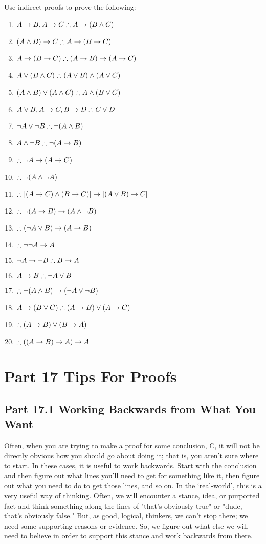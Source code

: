 \problempart
Use indirect proofs to prove the following:
\begin{enumerate}
\item $A \eif B, A \eif C \therefore A \eif (B \eand C)$
\item $(A \eand B) \eif C \therefore A \eif (B \eif C)$
\item $A \eif (B \eif C) \therefore (A \eif B) \eif (A \eif C)$
\item $A \eor (B \eand C) \therefore (A \eor B) \eand (A \eor C)$
\item $(A \eand B) \eor (A \eand C) \therefore A \eand (B \eor C)$
\item $A \eor B, A \eif C, B \eif D \therefore C \eor D$
\item $\enot A \lor \enot B \therefore \enot(A \eand B)$
\item $A \eand \enot B \therefore \enot(A \eif B)$
\item $\therefore \enot A \eif (A \eif C)$
\item $\therefore \enot(A \eand \enot A)$
\item $\therefore [(A \eif C) \eand (B \eif C)] \eif [(A \lor B) \eif C]$
\item $\therefore \enot(A \eif B) \eif (A \eand \enot B)$
\item $\therefore (\enot A \eor B) \eif (A \eif B)$
\item $\therefore \enot\enot A \eif A$
\item $\enot A \eif \enot B \therefore B \eif A$
\item $A \eif B \therefore \enot A \eor B$
\item $\therefore \enot(A \eand B) \eif (\enot A \eor \enot B)$
\item $A \eif (B \eor C) \therefore (A \eif B) \eor (A \eif C)$
\item $\therefore (A \eif B) \lor (B \eif A)$
\item $\therefore ((A \eif B) \eif A) \eif A$
\end{enumerate}

\chapter{Part 17 Tips For Proofs}
\section{Part 17.1 Working Backwards from What You Want}
Often, when you are trying to make a proof for some conclusion, C, it will not be directly obvious how you should go about doing it; that is, you aren't sure where to start. In these cases, it is useful to work backwards. Start with the conclusion and then figure out what lines you'll need to get for something like it, then figure out what you need to do to get those lines, and so on. In the `real-world', this is a very useful way of thinking. Often, we will encounter a stance, idea, or purported fact and think something along the lines of "that's obviously true" or "dude, that's obviously false." But, as good, logical, thinkers, we can't stop there; we need some supporting reasons or evidence. So, we figure out what else we will need to believe in order to support this stance and work backwards from there.

